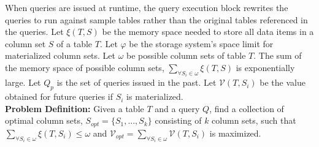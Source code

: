 \documentclass{sig-alternate-05-2015}
\begin{document}

When queries are issued at runtime, the query execution block rewrites the queries to run against sample tables rather than the original tables referenced in the queries.
Let $\xi(T, S)$ be the memory space needed to store all data items in a column set $S$ of a table $T$.
Let $\varphi$ be the storage system's space limit for materialized column sets.
Let $\omega$ be possible column sets of table $T$. 
The sum of the memory space of possible column sets, $\sum_{\forall S_i \in \omega} \xi(T, S)$ is exponentially large.
Let $Q_p$ is the set of queries issued in the past.
Let $\mathcal{V}(T, S_i)$ be the value obtained for future queries if $S_i$ is materialized.\\

\noindent
\textbf{Problem Definition:}  Given a table $T$ and a query $Q$, find a collection of optimal column sets, $S_{opt} = \{S_1, ..., S_k\}$ consisting of $k$ column sets, such that $\sum_{\forall S_i \in \omega} \xi(T, S_i) \leq \omega $ and $\mathcal{V}_{opt} = \sum_{\forall S_i \in \omega} \mathcal{V}(T, S_i) $ is maximized.\\
\end{document}
